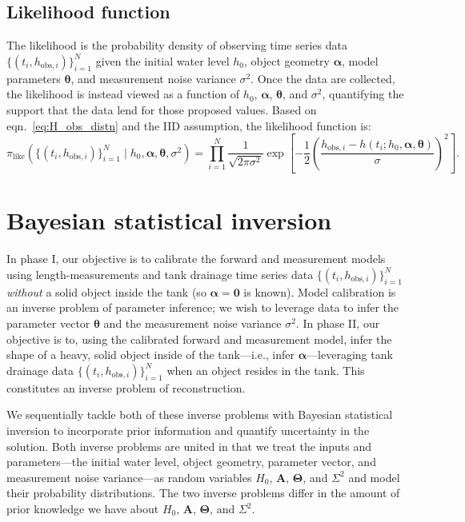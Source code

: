 \documentclass[openacc]{rsproca_new}%
\newcommand\thedata {$\{(t_i,h_{\text{obs}, i})\}_{i=1}^{N}$\xspace}
\newcommand\thedatanomath {\{(t_i,h_{\text{obs}, i})\}_{i=1}^{N}}
\begin{document}
\subsection{Likelihood function}
The likelihood is the probability density of observing time series data \thedata given the initial water level $h_0$, object geometry $\boldsymbol \alpha$, model parameters $\boldsymbol \theta$, and measurement noise variance $\sigma^2$. Once the data are collected, the likelihood is instead viewed as a function of $h_0$, $\boldsymbol \alpha$, $\boldsymbol \theta$, and $\sigma^2$, quantifying the support that the data lend for those proposed values. Based on eqn.~\ref{eq:H_obs_distn} and the IID assumption, the likelihood function is:
\begin{equation}
 \pi_{\text{like}}(\thedatanomath \mid h_0,\boldsymbol  \alpha, \boldsymbol \theta, \sigma^2 ) = \prod_{i=1}^N \frac{1}{\sqrt{2\pi\sigma^2}} \exp \left[-\frac{1}{2}\left(\frac{h_{\text{obs}, i} - h(t_i; h_0, \boldsymbol\alpha, \boldsymbol\theta)}{\sigma} \right)^2 \right]. \label{eq:like}
\end{equation}

\section{Bayesian statistical inversion}
In phase I, our objective is to calibrate the forward and measurement models using length-measurements and tank drainage time series data \thedata \emph{without} a solid object inside the tank (so $\boldsymbol \alpha=\mathbf{0}$ is known).
Model calibration is an inverse problem of parameter inference; we wish to leverage data to infer the parameter vector $\boldsymbol \theta$ and the measurement noise variance $\sigma^2$. 
In phase II, our objective is to, using the calibrated forward and measurement model, infer the shape of a heavy, solid object inside of the tank---i.e., infer $\boldsymbol \alpha$---leveraging tank drainage data \thedata when an object resides in the tank. This constitutes an inverse problem of reconstruction. 

We sequentially tackle both of these inverse problems with Bayesian statistical inversion \cite{calvetti2018inverse,waqar2023tutorial,kaipio2006statistical,dashti2013bayesian} to incorporate prior information and quantify uncertainty in the solution. 
Both inverse problems are united in that we treat the inputs and parameters---the initial water level, object geometry, parameter vector, and measurement noise variance---as random variables $H_0$, $\boldsymbol A$, $\boldsymbol \Theta$, and $\Sigma^2$ and model their probability distributions. The two inverse problems differ in the amount of prior knowledge we have about $H_0$, $\boldsymbol A$, $\boldsymbol \Theta$, and $\Sigma^2$.
\end{document}

